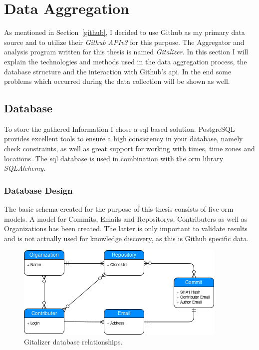 \section{Data Aggregation}\label{aggregator}
As mentioned in Section~\ref{github}, I decided to use Github as my primary data source and to utilize their \emph{Github APIv3} for this purpose.
The Aggregator and analysis program written for this thesis is named \emph{Gitalizer}.
In this section I will explain the technologies and methods used in the data aggregation process, the database structure and the interaction with Github's \ac{api}.
In the end some problems which occurred during the data collection will be shown as well.


\subsection{Database}\label{data-structure}
To store the gathered Information I chose a \ac{sql} based solution.
PostgreSQL provides excellent tools to ensure a high consistency in your database, namely check constraints, as well as great support for working with times, time zones and locations.
The \ac{sql} database is used in combination with the \ac{orm} library \emph{SQLAlchemy}.


\subsubsection{Database Design}\label{database-design}
The basic schema created for the purpose of this thesis consists of five \ac{orm} models.
A model for Commits, Emails and Repositorys, Contributers as well as Organizations has been created.
The latter is only important to validate results and is not actually used for knowledge discovery, as this is Github specific data.

\begin{figure}[H]
\includegraphics[scale=0.27]{./graphs/gitalizer-data-structure}
\centering
\caption{Gitalizer database relationships.}\label{fig:gitalizer-relationship}
\end{figure}

